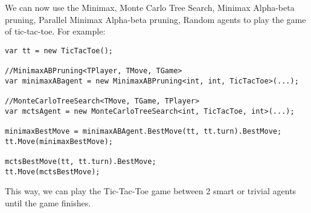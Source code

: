 We can now use the Minimax, Monte Carlo Tree Search, Minimax Alpha-beta pruning, Parallel Minimax Alpha-beta pruning, Random agents to play the game of tic-tac-toe. For example:

\begin{lstlisting}
var tt = new TicTacToe();

//MinimaxABPruning<TPlayer, TMove, TGame>
var minimaxABagent = new MinimaxABPruning<int, int, TicTacToe>(...);

//MonteCarloTreeSearch<TMove, TGame, TPlayer>
var mctsAgent = new MonteCarloTreeSearch<int, TicTacToe, int>(...);

minimaxBestMove = minimaxABAgent.BestMove(tt, tt.turn).BestMove;
tt.Move(minimaxBestMove);

mctsBestMove(tt, tt.turn).BestMove;
tt.Move(mctsBestMove);
\end{lstlisting}

This way, we can play the Tic-Tac-Toe game between 2 smart or trivial agents until the game finishes.